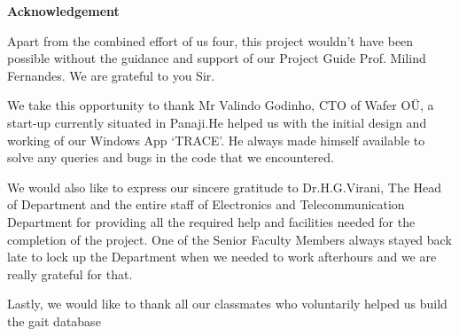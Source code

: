 \begin{center}
\begin{huge}
\bfseries{Acknowledgement}\\
\end{huge}
\end{center}
\vspace{1cm}

\noindent Apart from the combined effort of us four, this project wouldn’t have been possible without the guidance and support of our Project Guide Prof. Milind Fernandes. We are grateful to you Sir.

\noindent We take this opportunity to thank Mr Valindo Godinho, CTO of Wafer OÜ, a start-up currently situated in Panaji.He helped us with the initial design and working of our Windows App ‘TRACE’. He always made himself available to solve any queries and bugs in the code that we encountered.

\noindent We would also like to express our sincere gratitude to Dr.H.G.Virani, The Head of Department and the entire staff of Electronics and Telecommunication Department for providing all the required help and facilities needed for the completion of the project.
One of the Senior Faculty Members always stayed back late to lock up the Department when we needed to work afterhours and we are really grateful for that. 

\noindent Lastly, we would like to thank all our classmates who voluntarily helped us build the gait database 







